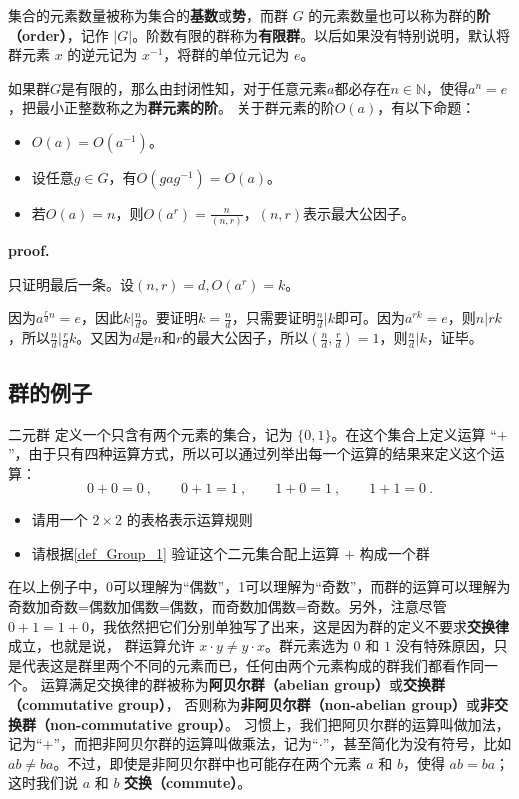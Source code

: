 集合的元素数量被称为集合的\textbf{基数}或\textbf{势}，而群 $G$ 的元素数量也可以称为群的\textbf{阶（order）}，记作 $|G|$。阶数有限的群称为\textbf{有限群}。以后如果没有特别说明，默认将群元素 $x$ 的逆元记为 $x^{-1}$，将群的单位元记为 $e$。

如果群$G$是有限的，那么由封闭性知，对于任意元素$a$都必存在$n\in \mathbb N$，使得$a^n=e$，把最小正整数称之为\textbf{群元素的阶}。
关于群元素的阶$O(a)$，有以下命题：
\begin{theorem}{}
\begin{itemize}
\item $O(a)=O(a^{-1})$。
\item 设任意$g\in G$，有$O(gag^{-1})=O(a)$。
\item 若$O(a)=n$，则$O(a^r)=\frac{n}{(n,r)}$，$(n,r)$表示最大公因子。
\end{itemize}
\end{theorem}
\textbf{proof.}

只证明最后一条。设$(n,r)=d,O(a^r)=k$。

因为$a^{\frac{r}{d}n}=e$，因此$k|\frac{n}{d}$。要证明$k=\frac{n}{d}$，只需要证明$\frac{n}{d}|k$即可。因为$a^{rk}=e$，则$n|rk$，所以$\frac{n}{d}|\frac{r}{d}k$。又因为$d$是$n$和$r$的最大公因子，所以$(\frac{n}{d},\frac{r}{d})=1$，则$\frac{n}{d}|k$，证毕。
\subsection{群的例子}

\begin{exercise}{二元群}\label{exe_Group_1}
定义一个只含有两个元素的集合，记为 $\{0, 1\}$。在这个集合上定义运算 “$+$”，由于只有四种运算方式，所以可以通过列举出每一个运算的结果来定义这个运算：
\begin{equation}\label{eq_Group_1}
0+0=0~, \qquad 0+1=1~, \qquad 1+0=1~, \qquad 1+1=0~.
\end{equation}
\begin{itemize}
\item 请用一个 $2\times2$ 的表格表示运算规则
\item 请根据\autoref{def_Group_1} 验证这个二元集合配上运算 $+$ 构成一个群
\end{itemize}
\end{exercise}

在以上例子中，0可以理解为“偶数”，1可以理解为“奇数”，而群的运算可以理解为奇数加奇数=偶数加偶数=偶数，而奇数加偶数=奇数。另外，注意尽管 $0+1=1+0$，我依然把它们分别单独写了出来，这是因为群的定义不要求\textbf{交换律}成立，也就是说， 群运算允许 $x\cdot y\neq y\cdot x$。群元素选为 $0$ 和 $1$ 没有特殊原因，只是代表这是群里两个不同的元素而已，任何由两个元素构成的群我们都看作同一个。 运算满足交换律的群被称为\textbf{阿贝尔群（abelian group）}或\textbf{交换群（commutative group）}， 否则称为\textbf{非阿贝尔群（non-abelian group）}或\textbf{非交换群（non-commutative group）}。 习惯上，我们把阿贝尔群的运算叫做加法，记为“$+$”，而把非阿贝尔群的运算叫做乘法，记为“$\cdot$”，甚至简化为没有符号，比如 $ab\not= ba$。不过，即使是非阿贝尔群中也可能存在两个元素 $a$ 和 $b$，使得 $ab=ba$；这时我们说 $a$ 和 $b$ \textbf{交换（commute）}。

